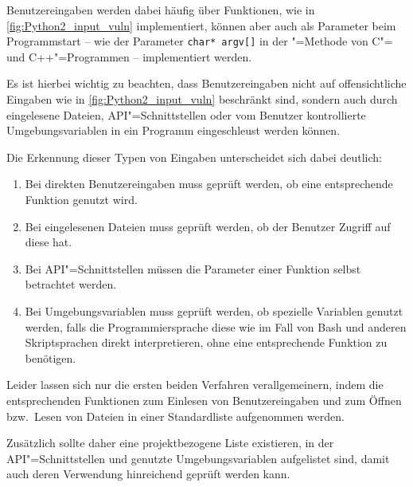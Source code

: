                 Benutzereingaben werden dabei häufig über Funktionen,
                wie in
                \vref{fig:Python2_input_vuln} implementiert,
                können aber auch als Parameter beim Programmstart
                --
                wie der Parameter
                \lstinline{char* argv[]} in der
                "=Methode von C"= und
                C++"=Programmen
                -- implementiert werden.

                Es ist hierbei wichtig zu beachten,
                dass Benutzereingaben nicht auf offensichtliche Eingaben
                wie in
                \vref{fig:Python2_input_vuln} beschränkt sind,
                sondern auch durch eingelesene Dateien,
                \gls{API}"=Schnittstellen oder
                vom Benutzer kontrollierte Umgebungsvariablen in ein Programm eingeschleust werden können.

                Die Erkennung dieser Typen von Eingaben unterscheidet sich dabei deutlich:

                \begin{enumerate}
                    \item Bei direkten Benutzereingaben muss geprüft werden,
                      ob eine entsprechende Funktion genutzt wird.
                    \item Bei eingelesenen Dateien muss geprüft werden,
                      ob der Benutzer Zugriff auf diese hat.
                    \item Bei
                      \gls{API}"=Schnittstellen müssen die Parameter einer Funktion selbst betrachtet werden.
                    \item Bei Umgebungsvariablen muss geprüft werden,
                      ob spezielle Variablen genutzt werden,
                      falls die Programmiersprache diese
                      wie im Fall von Bash und
                      anderen Skriptsprachen direkt interpretieren,
                      ohne eine entsprechende Funktion zu benötigen.
                \end{enumerate}

                Leider lassen sich nur die ersten beiden Verfahren verallgemeinern,
                indem die entsprechenden Funktionen zum Einlesen von Benutzereingaben und
                zum Öffnen bzw.\ Lesen von Dateien in einer Standardliste aufgenommen werden.

                Zusätzlich sollte daher eine projektbezogene Liste existieren,
                in der
                \gls{API}"=Schnittstellen und
                genutzte Umgebungsvariablen aufgelistet sind,
                damit auch deren Verwendung hinreichend geprüft werden kann.

